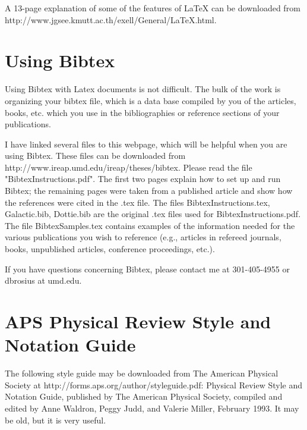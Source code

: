 A 13-page explanation of some of the features of LaTeX can be downloaded from http://www.jgsee.kmutt.ac.th/exell/General/LaTeX.html.


\section{Using Bibtex}

Using Bibtex with Latex documents is not difficult.  The bulk of the work is organizing your bibtex file, which is a data base compiled by you of the articles, books, etc. which you use in the bibliographies or reference sections of your publications.  

I have linked several files to this webpage, which will be helpful when you are using Bibtex.  These files can be downloaded from http://www.ireap.umd.edu/ireap/theses/bibtex.  Please read the file "BibtexInstructions.pdf".  The first two pages explain how to set up and run Bibtex; the remaining pages were taken from a published article and show how the references were cited in the .tex file.   The files BibtexInstructions.tex, Galactic.bib, Dottie.bib are the original .tex files used for BibtexInstructions.pdf.  The file BibtexSamples.tex contains examples of the information needed for the various publications you wish to reference (e.g., articles in refereed journals, books, unpublished articles, conference proceedings, etc.).

If you have questions concerning Bibtex, please contact me at 301-405-4955 or dbrosius at umd.edu.


\section{APS Physical Review Style and Notation Guide}

The following style guide may be downloaded from The American Physical Society at http://forms.aps.org/author/styleguide.pdf:  Physical Review Style and Notation Guide, published by The American Physical Society, compiled and edited by Anne Waldron, Peggy Judd, and Valerie Miller, February 1993.  It may be old, but it is very useful.

